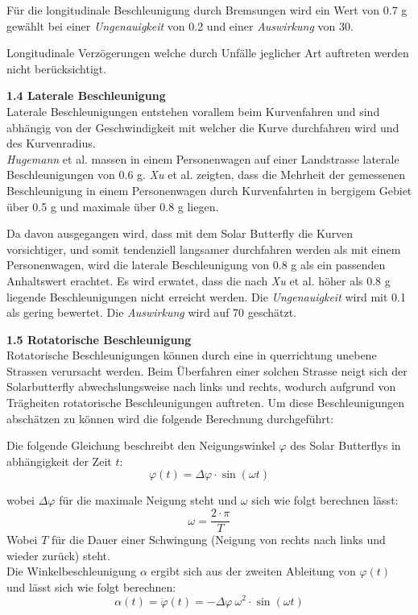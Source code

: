 \begin{description}
    Für die longitudinale Beschleunigung durch Bremsungen wird ein Wert von 0.7 g gewählt bei einer \emph{Ungenauigkeit} von 0.2 und einer \emph{Auswirkung} von 30.

    Longitudinale Verzögerungen welche durch Unfälle jeglicher Art auftreten werden nicht berücksichtigt.

    \item \textbf{1.4 Laterale Beschleunigung}\\
    Laterale Beschleunigungen entstehen vorallem beim Kurvenfahren und sind abhängig von der Geschwindigkeit mit welcher die Kurve durchfahren wird und des Kurvenradius.\\
    \emph{Hugemann} et al. \cite{Kurv.1} massen in einem Personenwagen auf einer Landstrasse laterale Beschleunigungen von 0.6 g. \emph{Xu} et al. \cite{Kurv.2} zeigten, dass die Mehrheit der gemessenen Beschleunigung in einem Personenwagen durch Kurvenfahrten in bergigem Gebiet über 0.5 g und maximale über 0.8 g liegen.

    Da davon ausgegangen wird, dass mit dem Solar Butterfly die Kurven vorsichtiger, und somit tendenziell langsamer durchfahren werden als mit einem Personenwagen, wird die laterale Beschleunigung von 0.8 g als ein passenden Anhaltswert erachtet. Es wird erwatet, dass die nach \emph{Xu} et al. höher als 0.8 g liegende Beschleunigungen nicht erreicht werden. Die \emph{Ungenauigkeit} wird mit 0.1 als gering bewertet. Die \emph{Auswirkung} wird auf 70 geschätzt.

    \item \textbf{1.5 Rotatorische Beschleunigung}\\
    Rotatorische Beschleunigungen können durch eine in querrichtung unebene Strassen verursacht werden. Beim Überfahren einer solchen Strasse neigt sich der Solarbutterfly abwechslungsweise nach links und rechts, wodurch aufgrund von Trägheiten rotatorische Beschleunigungen auftreten. Um diese Beschleunigungen abschätzen zu können wird die folgende Berechnung durchgeführt:

    Die folgende Gleichung beschreibt den Neigungswinkel $\varphi$ des Solar Butterflys in abhängigkeit der Zeit $t$:
    \begin{equation}
      \varphi(t) = \Delta \varphi \cdot \sin \left(\omega t \right)
    \end{equation}

    wobei $\Delta\varphi$ für die maximale Neigung steht und $\omega$ sich wie folgt berechnen lässt:
    \begin{equation}
      \omega = \frac{2\cdot \pi}{T}
    \end{equation}
    Wobei $T$ für die Dauer einer Schwingung (Neigung von rechts nach links und wieder zurück) steht.\\
    Die Winkelbeschleunigung $\alpha$ ergibt sich aus der zweiten Ableitung von $\varphi(t)$ und lässt sich wie folgt berechnen:
    \begin{equation}
      \alpha(t) = \ddot \varphi(t) = -\Delta\varphi\:\omega^2 \cdot \sin \left(\omega t \right)
    \end{equation}


\end{description}
